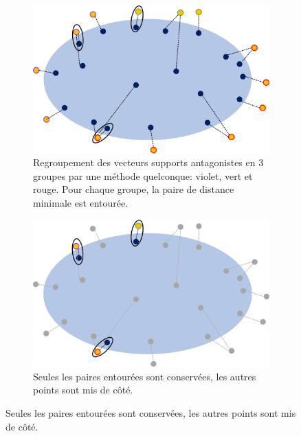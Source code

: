 \begin{figure}[h!tpb]
    \begin{subfigure}[t]{0.45\textwidth}
      \centering\includegraphics[width=\textwidth]{S4-Explicabilite_globale/figures/tri1.png}
      \caption{Regroupement des vecteurs supports antagonistes en 3 groupes par une méthode quelconque: violet, vert et rouge. Pour chaque groupe, la paire de distance minimale est entourée.} \label{fig:tri1}
    \end{subfigure} \qquad
    \begin{subfigure}[t]{0.45\textwidth}
      \centering\includegraphics[width=\textwidth]{S4-Explicabilite_globale/figures/tri2.png}
      \caption{Seules les paires entourées sont conservées, les autres points sont mis de côté.} \label{fig:tri2}
    \end{subfigure}


\end{figure}
